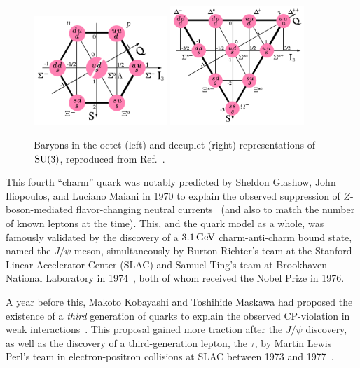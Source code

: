 \begin{figure}[ht]
	\centering
	\includegraphics[width=0.45\textwidth]{figures/01-SM-03-SM/qcd/Baryon-octet-small.svg.png}
	\includegraphics[width=0.45\textwidth]{figures/01-SM-03-SM/qcd/Baryon-decuplet-small.svg.png}
	\caption{Baryons in the octet (left) and decuplet (right) representations of $\SU[3]$, reproduced from Ref.~\cite{enwiki:1243626239}.}
	\label{fig:01_sm_qcd_eightfoldway}
\end{figure}

This fourth ``charm'' quark was notably predicted by Sheldon Glashow, John Iliopoulos, and Luciano Maiani in 1970 to explain the observed suppression of $Z$-boson-mediated flavor-changing neutral currents~\cite{Glashow:1970gm} (and also to match the number of known leptons at the time).
This, and the quark model as a whole, was famously validated by the discovery of a $3.1 \,\text{Ge\hspace{-.08em}V}$ charm-anti-charm bound state, named the $J/\psi$ meson, simultaneously by Burton Richter's team at the Stanford Linear Accelerator Center (SLAC) and Samuel Ting's team at Brookhaven National Laboratory in 1974~\cite{SLAC-SP-017:1974ind, E598:1974sol}, both of whom received the Nobel Prize in 1976.

A year before this, Makoto Kobayashi and Toshihide Maskawa had proposed the existence of a \textit{third} generation of quarks to explain the observed CP-violation in weak interactions~\cite{Kobayashi:1973fv}.
This proposal gained more traction after the $J/\psi$ discovery, as well as the discovery of a third-generation lepton, the $\tau$, by Martin Lewis Perl's team in electron-positron collisions at SLAC between 1973 and 1977~\cite{Perl:1975bf}.


